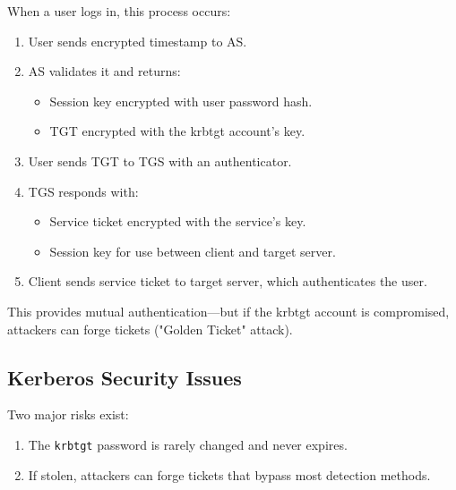 When a user logs in, this process occurs:
\begin{enumerate}
    \item User sends encrypted timestamp to AS.
    \item AS validates it and returns:
        \begin{itemize}
            \item Session key encrypted with user password hash.
            \item TGT encrypted with the krbtgt account's key.
        \end{itemize}
    \item User sends TGT to TGS with an authenticator.
    \item TGS responds with:
        \begin{itemize}
            \item Service ticket encrypted with the service's key.
            \item Session key for use between client and target server.
        \end{itemize}
    \item Client sends service ticket to target server, which authenticates the user.
\end{enumerate}

This provides mutual authentication—but if the krbtgt account is compromised, attackers can forge tickets ("Golden Ticket" attack).

\subsection{Kerberos Security Issues}

Two major risks exist:
\begin{enumerate}
    \item The \texttt{krbtgt} password is rarely changed and never expires.
    \item If stolen, attackers can forge tickets that bypass most detection methods.
\end{enumerate}

